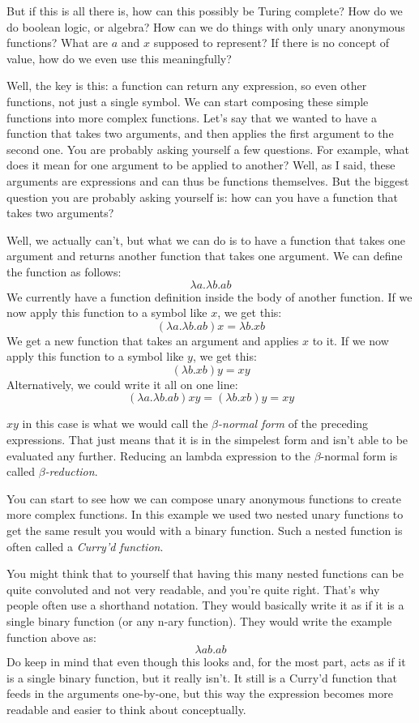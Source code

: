 \documentclass[a4paper]{article}
\begin{document}
But if this is all there is, how can this possibly be Turing complete? How do
we do boolean logic, or algebra? How can we do things with only unary anonymous
functions? What are \(a\) and \(x\) supposed to represent? If there is no
concept of value, how do we even use this meaningfully?

Well, the key is this: a function can return any expression, so even other
functions, not just a single symbol. We can start composing these simple
functions into more complex functions. Let's say that we wanted to have a
function that takes two arguments, and then applies the first argument to the
second one. You are probably asking yourself a few questions. For example, what
does it mean for one argument to be applied to another? Well, as I said, these
arguments are expressions and can thus be functions themselves. But the biggest
question you are probably asking yourself is: how can you have a function that
takes two arguments?

Well, we actually can't, but what we can do is to have a function that takes
one argument and returns another function that takes one argument. We can
define the function as follows:
\[\lambda a.\lambda b.ab\]
We currently have a function definition inside the body of another function. If
we now apply this function to a symbol like \(x\), we get this:
\[(\lambda a.\lambda b.ab)x=\lambda b.xb\]
We get a new function that takes an argument and applies \(x\) to it. If we now
apply this function to a symbol like \(y\), we get this:
\[(\lambda b.xb)y=xy\]
Alternatively, we could write it all on one line:
\[(\lambda a.\lambda b.ab)xy=(\lambda b.xb)y=xy\]

\(xy\) in this case is what we would call the \emph{\(\beta\)-normal form} of
the preceding expressions. That just means that it is in the simpelest form and
isn't able to be evaluated any further. Reducing an lambda expression to the
\(\beta\)-normal form is called \emph{\(\beta\)-reduction}.

You can start to see how we can compose unary anonymous functions to create
more complex functions. In this example we used two nested unary functions to
get the same result you would with a binary function. Such a nested function is
often called a \emph{Curry'd function}.

You might think that to yourself that having this many nested functions can be
quite convoluted and not very readable, and you're quite right. That's why
people often use a shorthand notation. They would basically write it as if it
is a single binary function (or any n-ary function). They would write the
example function above as:
\[\lambda ab.ab\]
Do keep in mind that even though this looks and, for the most part, acts as if
it is a single binary function, but it really isn't. It still is a Curry'd
function that feeds in the arguments one-by-one, but this way the expression
becomes more readable and easier to think about conceptually.
\end{document}
